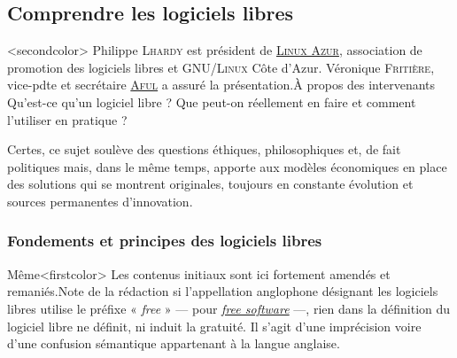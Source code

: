 \subsection[Comprendre les logiciels libres]{Comprendre les logiciels libres}
\label{sub:I.4.3}

\caution[t]<secondcolor>{%
Philippe \textsc{Lhardy} est président de \href{https://www.linux-azur.org/}{\textsc{Linux Azur}}, association de promotion des logiciels libres et \textsc{GNU/Linux} Côte d’Azur. Véronique \textsc{Fritière}, vice-pdte et secrétaire \href{https://aful.org/}{\textsc{Aful}} a assuré la présentation.}{À propos des intervenants}
Qu'est-ce qu'un logiciel libre ? Que peut-on réellement en faire et comment l'utiliser en pratique ? 

Certes, ce sujet soulève des questions éthiques, philosophiques et, de fait politiques mais, dans le même temps, apporte aux modèles économiques en place des solutions qui se montrent originales, toujours en constante évolution et sources permanentes d'innovation. 

\subsubsection[Fondements et principes]{Fondements et principes des logiciels libres}
\label{subsub:I.4.3.1}

Même\caution[t]<firstcolor>{%
Les contenus initiaux sont ici fortement amendés et remaniés.}{Note de la rédaction}
si l’appellation anglophone désignant les logiciels libres utilise le préfixe « \textit{free} »
 --- pour \href{https://www.gnu.org/philosophy/free-sw.fr.html}{\textit{free software}} ---, rien dans la définition du logiciel libre ne définit, ni induit la gratuité. Il s'agit d'une imprécision voire d'une confusion sémantique appartenant à la langue anglaise. 
 
